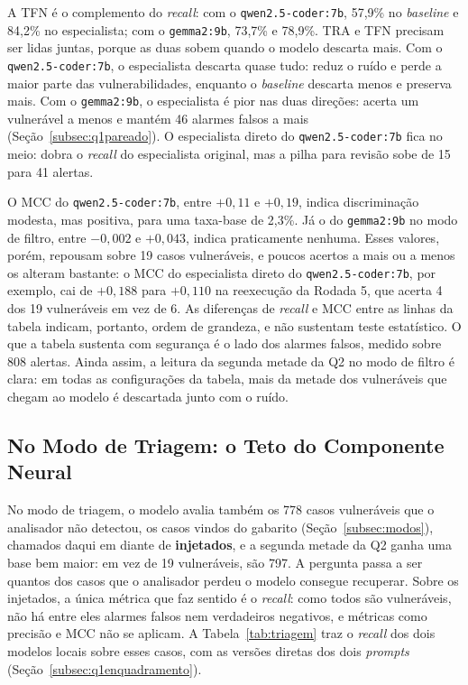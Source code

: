 A TFN é o complemento do \textit{recall}: com o \texttt{qwen2.5-coder:7b}, 57,9\% no \textit{baseline} e 84,2\% no especialista; com o \texttt{gemma2:9b}, 73,7\% e 78,9\%. TRA e TFN precisam ser lidas juntas, porque as duas sobem quando o modelo descarta mais. Com o \texttt{qwen2.5-coder:7b}, o especialista descarta quase tudo: reduz o ruído e perde a maior parte das vulnerabilidades, enquanto o \textit{baseline} descarta menos e preserva mais. Com o \texttt{gemma2:9b}, o especialista é pior nas duas direções: acerta um vulnerável a menos e mantém 46 alarmes falsos a mais (Seção~\ref{subsec:q1pareado}). O especialista direto do \texttt{qwen2.5-coder:7b} fica no meio: dobra o \textit{recall} do especialista original, mas a pilha para revisão sobe de 15 para 41 alertas.

O MCC do \texttt{qwen2.5-coder:7b}, entre $+0{,}11$ e $+0{,}19$, indica discriminação modesta, mas positiva, para uma taxa-base de 2,3\%. Já o do \texttt{gemma2:9b} no modo de filtro, entre $-0{,}002$ e $+0{,}043$, indica praticamente nenhuma. Esses valores, porém, repousam sobre 19 casos vulneráveis, e poucos acertos a mais ou a menos os alteram bastante: o MCC do especialista direto do \texttt{qwen2.5-coder:7b}, por exemplo, cai de $+0{,}188$ para $+0{,}110$ na reexecução da Rodada 5, que acerta 4 dos 19 vulneráveis em vez de 6. As diferenças de \textit{recall} e MCC entre as linhas da tabela indicam, portanto, ordem de grandeza, e não sustentam teste estatístico. O que a tabela sustenta com segurança é o lado dos alarmes falsos, medido sobre 808 alertas. Ainda assim, a leitura da segunda metade da Q2 no modo de filtro é clara: em todas as configurações da tabela, mais da metade dos vulneráveis que chegam ao modelo é descartada junto com o ruído.

\subsection{No Modo de Triagem: o Teto do Componente Neural}
\label{subsec:q2triagem}

No modo de triagem, o modelo avalia também os 778 casos vulneráveis que o analisador não detectou, os casos vindos do gabarito (Seção~\ref{subsec:modos}), chamados daqui em diante de \textbf{injetados}, e a segunda metade da Q2 ganha uma base bem maior: em vez de 19 vulneráveis, são 797. A pergunta passa a ser quantos dos casos que o analisador perdeu o modelo consegue recuperar. Sobre os injetados, a única métrica que faz sentido é o \textit{recall}: como todos são vulneráveis, não há entre eles alarmes falsos nem verdadeiros negativos, e métricas como precisão e MCC não se aplicam. A Tabela~\ref{tab:triagem} traz o \textit{recall} dos dois modelos locais sobre esses casos, com as versões diretas dos dois \textit{prompts} (Seção~\ref{subsec:q1enquadramento}).

